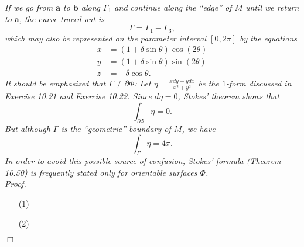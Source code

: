 \documentclass{article}
\begin{document}
\emph{If we go from $\mathbf{a}$ to $\mathbf{b}$ along $\Gamma_1$
and continue along the ``edge'' of $M$ until we return to $\mathbf{a}$,
the curve traced out is
\[
  \Gamma = \Gamma_1 - \Gamma_3,
\]
which may also be represented on the parameter interval $[0,2\pi]$ by the equations
\begin{align*}
  x &= (1+\delta\sin\theta) \cos(2\theta) \\
  y &= (1+\delta\sin\theta) \sin(2\theta) \\
  z &= -\delta\cos\theta.
\end{align*}
It should be emphasized that $\Gamma \neq \partial \Phi$:
Let $\eta = \frac{xdy-ydx}{x^2+y^2}$
be the $1$-form discussed in Exercise 10.21 and Exercise 10.22.
Since $d\eta = 0$, Stokes' theorem shows that
\[
  \int_{\partial \Phi} \eta = 0.
\]
But although $\Gamma$ is the ``geometric'' boundary of $M$, we have
\[
  \int_{\Gamma} \eta = 4 \pi.
\]
In order to avoid this possible source of confusion,
Stokes' formula (Theorem 10.50) is frequently stated only for orientable surfaces $\Phi$.} \\



\emph{Proof.}
\begin{enumerate}
\item[(1)]
\item[(2)]

\end{enumerate}
$\Box$ \\\\



\end{document}
